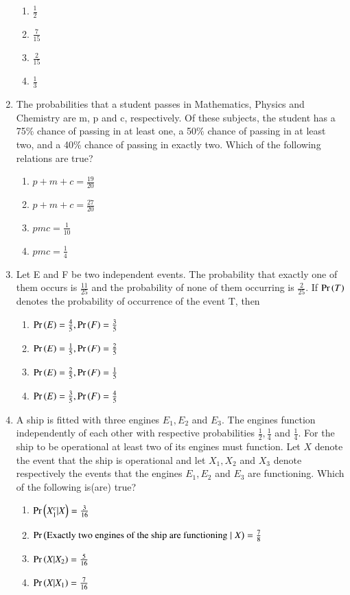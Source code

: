 \documentclass[journal,12pt,twocolumn,article]{IEEEtran}
\theoremstyle{remark}
\begin{document}
\begin{enumerate}[start = 3]
\begin{enumerate}
\item $\frac{1}{2}$
\item $\frac{7}{15}$
\item $\frac{2}{15}$
\item $\frac{1}{3}$
\end{enumerate}
\item The probabilities that a student passes in Mathematics, Physics and Chemistry are m, p and c, respectively. Of these subjects, the student has a 75\% chance of passing in at least one, a 50\% chance of passing in at least two, and a 40\% chance of passing in exactly two. Which of the following relations are true?
\hfill{}
\begin{enumerate}
\item $p+m+c=\frac{19}{20}$
\item $p+m+c=\frac{27}{20}$
\item $pmc=\frac{1}{10}$
\item $pmc=\frac{1}{4}$
\end{enumerate}
\item Let E and F be two independent events. The probability that exactly one of them occurs is $\frac{11}{25}$ and the probability of none of them occurring is $\frac{2}{25}$. If $\Pr\left(T\right)$ denotes the probability of occurrence of the event T, then
\hfill{}
\begin{enumerate}
\item $\Pr\left(E\right)=\frac{4}{5},\Pr\left(F\right)=\frac{3}{5}$
\item $\Pr\left(E\right)=\frac{1}{5},\Pr\left(F\right)=\frac{2}{5}$
\item $\Pr\left(E\right)=\frac{2}{5},\Pr\left(F\right)=\frac{1}{5}$
\item $\Pr\left(E\right)=\frac{3}{5},\Pr\left(F\right)=\frac{4}{5}$
\end{enumerate}
\item A ship is fitted with three engines $E_1,E_2$ and $E_3$. The engines function independently of each other with respective probabilities $\frac{1}{2},\frac{1}{4}$ and $\frac{1}{4}$. For the ship to be operational at least two of its engines must function. Let $X$ denote the event that the ship is operational and let $X_1,X_2$ and $X_3$ denote respectively the events that the engines $E_1,E_2$ and $E_3$ are functioning. Which of the following is(are) true?
\hfill{}
\begin{enumerate}
\item $\Pr\left(X_1^c|X\right)=\frac{3}{16}$
\item $\Pr\left(\text{Exactly two engines of the ship are functioning}\;|\; X\right)=\frac{7}{8}$
\item $\Pr\left(X|X_2\right)=\frac{5}{16}$
\item $\Pr\left(X|X_1\right)=\frac{7}{16}$
\end{enumerate}
\end{enumerate}
\end{document}
